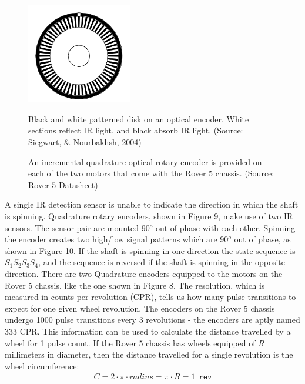 \documentclass[a4paper]{article}
\begin{document}
\begin{figure}[h]
\centering
\begin{minipage}[t]{0.45\textwidth}
\centering
\includegraphics[height=4.4cm]{optical_enc}
\caption{Black and white patterned disk on an optical encoder. White sections reflect IR light, and black absorb IR light. (Source: Siegwart, \& Nourbakhsh, 2004)}
\end{minipage}
\hspace{1cm}
\begin{minipage}[t]{0.45\textwidth}
\centering
{}
\caption{An incremental quadrature optical rotary encoder is provided on each of the two motors that come with the Rover 5 chassis. (Source: Rover 5 Datasheet)}
\end{minipage}
\end{figure}

A single IR detection sensor is unable to indicate the direction in which the shaft is spinning. Quadrature rotary encoders, shown in Figure 9, make use of two IR sensors. The sensor pair are mounted 90$^o$ out of phase with each other. Spinning the encoder creates two high/low signal patterns which are 90$^o$ out of phase, as shown in Figure 10. If the shaft is spinning in one direction the state sequence is $S_1 S_2 S_3 S_4$, and the sequence is reversed if the shaft is spinning in the opposite direction. There are two Quadrature encoders equipped to the motors on the Rover 5 chassis, like the one shown in Figure 8. The resolution, which is measured in counts per revolution (CPR), tells us how many pulse transitions to expect for one given wheel revolution. The encoders on the Rover 5 chassis undergo 1000 pulse transitions every 3 revolutions - the encoders are aptly named 333 CPR. This information can be used to calculate the distance travelled by a wheel for 1 pulse count. If the Rover 5 chassis has wheels equipped of $R$ millimeters in diameter, then the distance travelled for a single revolution is the wheel circumference:
\begin{align*}
C 	= 2 \cdot \pi \cdot radius = \pi \cdot R = 1 \ \ \texttt{rev}
\end{align*}
\end{document}
